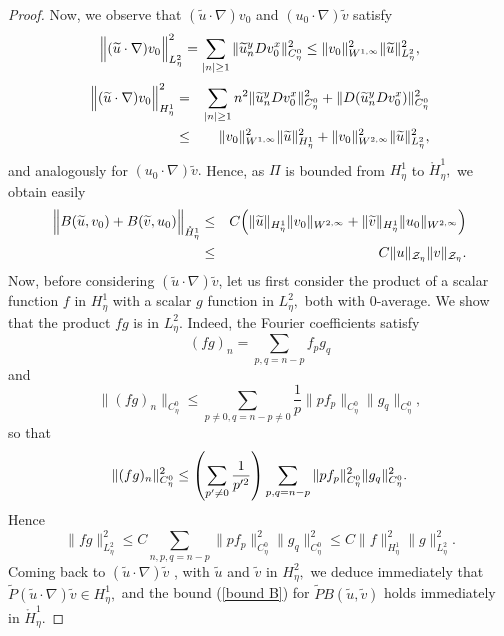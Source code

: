 \documentclass[11pt]{article}
\begin{document}
\begin{proof}
Now, we observe that $(\widetilde{u}\cdot \nabla )v_{0}$ and $(u_{0}\cdot
\nabla )\widetilde{v}$ satisfy%
\begin{equation*}
\Bigl\|(\widetilde{u}\cdot \nabla )v_{0} \Bigr\|_{L_{\eta}^{2}}^{2}=\sum_{|n|\geq 1}\|%
\widetilde{u}_{n}^{y}Dv_{0}^{x}\|_{C_{\eta}^{0}}^{2}\leq \|v_{0}\|_{W^{1,\infty
}}^{2}\|\widetilde{u}\|_{L_{\eta}^{2}}^{2},
\end{equation*}%
\begin{eqnarray*}
\Bigl\|(\widetilde{u}\cdot \nabla )v_{0} \Bigr\|_{H_{\eta}^{1}}^{2} &=&\sum_{|n|\geq
1}n^{2}\|\widetilde{u}_{n}^{y}Dv_{0}^{x}\|_{C_{\eta}^{0}}^{2}+\|D(\widetilde{u}%
_{n}^{y}Dv_{0}^{x})\|_{C_{\eta}^{0}}^{2} \\
&\leq &\|v_{0}\|_{W^{1,\infty }}^{2}\|\widetilde{u}%
\|_{H_{\eta}^{1}}^{2}+\|v_{0}\|_{W^{2,\infty }}^{2}\|\widetilde{u}%
\|_{L_{\eta}^{2}}^{2},
\end{eqnarray*}%
and analogously for $(u_{0}\cdot \nabla )\widetilde{v}.$ Hence, as $\Pi $
is bounded from $H_{\eta}^{1}$ to $\mathring{H}_{\eta}^{1},$ we obtain easily%
\begin{eqnarray*}
\Bigl\|B(\widetilde{u},v_{0})+B(\widetilde{v},u_{0})\Bigr\|_{\mathring{H}_{\eta}^{1}}
&\leq &C \Bigl(\|\widetilde{u}\|_{H_{\eta}^{1}}\|v_{0}\|_{W^{2,\infty }}+\|\widetilde{%
v}\|_{H_{\eta}^{1}}\|u_{0}\|_{W^{2,\infty }} \Bigr) \\
&\leq &C\|u\|_{\mathcal{Z}_{\eta}}\|v\|_{\mathcal{Z}_{\eta}}.
\end{eqnarray*}%
Now, before considering $(\widetilde{u}\cdot \nabla )\widetilde{v}$, let us
first consider the product of a scalar function $f$ in $H_{\eta}^{1}$ with a
scalar $g$ function in $L_{\eta}^{2},$ both with 0-average$.$ We show that the
product $fg$ is in $L_{\eta}^{2}.$ Indeed, the Fourier coefficients satisfy
\begin{equation*}
(fg)_{n}=\sum_{p,q=n-p}f_{p}g_{q}
\end{equation*}%
and%
\begin{equation*}
\|(fg)_{n}\|_{C_{\eta}^{0}}\leq \sum_{p\neq 0,q=n-p\neq 0}\frac{1}{p}%
\|pf_{p}\|_{C_{\eta}^{0}}\|g_{q}\|_{C_{\eta}^{0}},
\end{equation*}%
so that%
\begin{equation*}
\|(fg)_{n}\|_{C_{\eta}^{0}}^{2}\leq \left( \sum_{p^{\prime }\neq 0}\frac{1}{%
p^{\prime 2}}\right)
\sum_{p,q=n-p}\|pf_{p}\|_{C_{\eta}^{0}}^{2}\|g_{q}\|_{C_{\eta}^{0}}^{2}.
\end{equation*}%
Hence%
\begin{equation*}
\|fg\|_{L_{\eta}^{2}}^{2}\leq
C\sum_{n,p,q=n-p}\|pf_{p}\|_{C_{\eta}^{0}}^{2}\|g_{q}\|_{C_{\eta}^{0}}^{2}\leq
C\|f\|_{H_{\eta}^{1}}^{2}\|g\|_{L_{\eta}^{2}}^{2}.
\end{equation*}%
Coming back to $(\widetilde{u}\cdot \nabla )\widetilde{v}$ , with $%
\widetilde{u}$ and $\widetilde{v}$ in $H_{\eta}^{2},$ we deduce immediately
that $\widetilde{P}(\widetilde{u}\cdot \nabla )\widetilde{v}\in H_{\eta}^{1},$
and the bound (\ref{bound B}) for $\widetilde{P}B(\widetilde{u},\widetilde{v}%
)$ holds immediately in $\mathring{H}_{\eta}^{1}.$


\end{proof}
\end{document}

